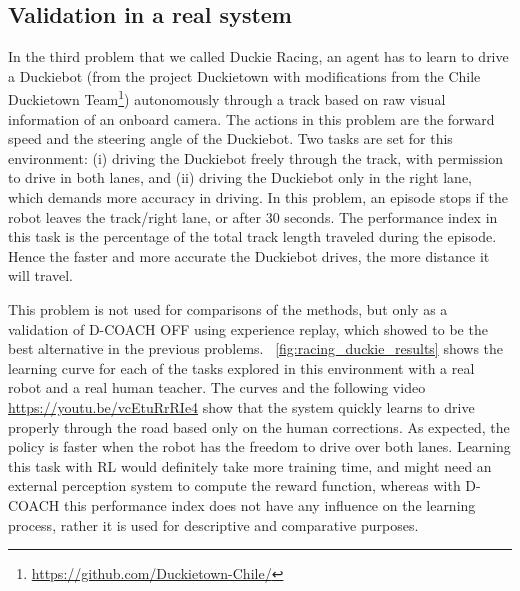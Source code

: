 \newpage

\subsection{Validation in a real system}
In the third problem that we called Duckie Racing, an agent has to learn to drive a Duckiebot (from the project  Duckietown \cite{Paull2017} with modifications from the Chile Duckietown Team\footnote{\url{https://github.com/Duckietown-Chile/}}) autonomously through a track based on raw visual information of an onboard camera. The actions in this problem are the forward speed and the steering angle of the Duckiebot. Two tasks are set for this environment: (i) driving the Duckiebot freely through the track, with permission to drive in both lanes, and (ii) driving the Duckiebot only in the right lane, which demands more accuracy in driving. In this problem, an episode stops if the robot leaves the track/right lane, or after 30 seconds. The performance index in this task is the percentage of the total track length traveled during the episode. Hence the faster and more accurate the Duckiebot drives, the more distance it will travel.

This problem is not used for comparisons of the methods, but only as a validation of D-COACH OFF using experience replay, which showed to be the best alternative in the previous problems. \figurename~\ref{fig:racing_duckie_results} shows the learning curve for each of the tasks explored in this environment with a real robot and a real human teacher. The curves and the following video \url{https://youtu.be/vcEtuRrRIe4} show that the system quickly learns to drive properly through the road based only on the human corrections. As expected, the policy is faster when the robot has the freedom to drive over both lanes. Learning this task with RL would definitely take more training time, and might need an external perception system to compute the reward function, whereas with D-COACH this performance index does not have any influence on the learning process, rather it is used for descriptive and comparative purposes.

